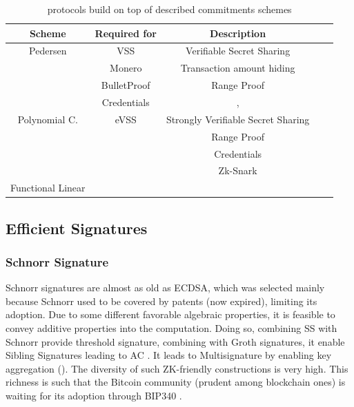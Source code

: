 \documentclass[11pt]{llncs2e/llncs}
\begin{document}
 
\begin{table}
\begin{center}
 \begin{tabular}{ |c| c|c|c|c|}
  \hline
  Scheme & Required for & Description \\
  \hline\hline
  Pedersen & VSS& Verifiable Secret Sharing\\
           & Monero & Transaction amount hiding \\
           & BulletProof & Range Proof \\
           & Credentials & \cite{LCKO21}, \cite{ElkhiyaouiCA21} \\
  \hline
  Polynomial C. & eVSS& Strongly Verifiable Secret Sharing \\
                & & Range Proof\\
                & & Credentials \\
                & & Zk-Snark \\
  \hline
  Functional Linear & & \\
  \hline
  
  \hline
 \end{tabular}
 \end{center}
 \caption{protocols build on top of described commitments schemes}
 \label{tab-usecommit}
\end{table}
 
\subsection{Efficient Signatures}
\label{section-sig}

\subsubsection{Schnorr Signature}
Schnorr signatures  are almost as old as ECDSA, which was selected mainly because Schnorr used to be covered by patents (now expired), limiting its adoption. Due to some different favorable algebraic properties, it is feasible to convey additive properties into the computation. Doing so, combining SS \cite{Shamir79} with Schnorr provide threshold signature, combining with Groth signatures, it enable Sibling Signatures leading to AC \cite{CamenischDD17}. It leads to Multisignature by enabling key aggregation (). The diversity of such ZK-friendly constructions is very high. This richness is such that the Bitcoin community (prudent among blockchain ones) is waiting for its adoption through BIP340 \cite{BIP340}. 
 
\end{document}
